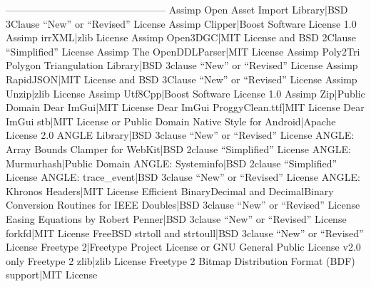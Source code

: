 \documentclass[letterpaper,10pt,english]{sphinxmanual}
\begin{document}
\sphinxAtStartPar
————————————————
Assimp \sphinxhyphen{} Open Asset Import Library|BSD 3\sphinxhyphen{}Clause “New” or “Revised” License
Assimp \sphinxhyphen{} Clipper|Boost Software License 1.0
Assimp \sphinxhyphen{} irrXML|zlib License
Assimp \sphinxhyphen{} Open3DGC|MIT License and BSD 2\sphinxhyphen{}Clause “Simplified” License
Assimp \sphinxhyphen{} The OpenDDL\sphinxhyphen{}Parser|MIT License
Assimp \sphinxhyphen{} Poly2Tri Polygon Triangulation Library|BSD 3\sphinxhyphen{}clause “New” or “Revised” License
Assimp \sphinxhyphen{} RapidJSON|MIT License and BSD 3\sphinxhyphen{}Clause “New” or “Revised” License
Assimp \sphinxhyphen{} Unzip|zlib License
Assimp \sphinxhyphen{} Utf8Cpp|Boost Software License 1.0
Assimp \sphinxhyphen{} Zip|Public Domain
Dear ImGui|MIT License
Dear ImGui \sphinxhyphen{} ProggyClean.ttf|MIT License
Dear ImGui \sphinxhyphen{} stb|MIT License or Public Domain
Native Style for Android|Apache License 2.0
ANGLE Library|BSD 3\sphinxhyphen{}clause “New” or “Revised” License
ANGLE: Array Bounds Clamper for WebKit|BSD 2\sphinxhyphen{}clause “Simplified” License
ANGLE: Murmurhash|Public Domain
ANGLE: Systeminfo|BSD 2\sphinxhyphen{}clause “Simplified” License
ANGLE: trace\_event|BSD 3\sphinxhyphen{}clause “New” or “Revised” License
ANGLE: Khronos Headers|MIT License
Efficient Binary\sphinxhyphen{}Decimal and Decimal\sphinxhyphen{}Binary Conversion Routines for IEEE Doubles|BSD 3\sphinxhyphen{}clause “New” or “Revised” License
Easing Equations by Robert Penner|BSD 3\sphinxhyphen{}clause “New” or “Revised” License
forkfd|MIT License
FreeBSD strtoll and strtoull|BSD 3\sphinxhyphen{}clause “New” or “Revised” License
Freetype 2|Freetype Project License or GNU General Public License v2.0 only
Freetype 2 \sphinxhyphen{} zlib|zlib License
Freetype 2 \sphinxhyphen{} Bitmap Distribution Format (BDF) support|MIT License
\end{document}
